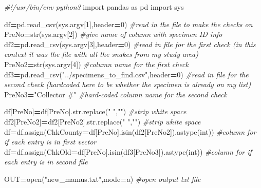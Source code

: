 \documentclass[
]{article}
\newenvironment{Shaded}{\begin{snugshade}}{\end{snugshade}}
\newcommand{\BuiltInTok}[1]{#1}
\newcommand{\CommentTok}[1]{\textcolor[rgb]{0.56,0.35,0.01}{\textit{#1}}}
\newcommand{\DecValTok}[1]{\textcolor[rgb]{0.00,0.00,0.81}{#1}}
\newcommand{\ImportTok}[1]{#1}
\newcommand{\NormalTok}[1]{#1}
\newcommand{\OperatorTok}[1]{\textcolor[rgb]{0.81,0.36,0.00}{\textbf{#1}}}
\newcommand{\StringTok}[1]{\textcolor[rgb]{0.31,0.60,0.02}{#1}}
\begin{document}
\begin{Shaded}
\begin{Highlighting}[]
\CommentTok{\#!/usr/bin/env python3}
\ImportTok{import}\NormalTok{ pandas }\ImportTok{as}\NormalTok{ pd}
\ImportTok{import}\NormalTok{ sys}

\NormalTok{df}\OperatorTok{=}\NormalTok{pd.read\_csv(sys.argv[}\DecValTok{1}\NormalTok{],header}\OperatorTok{=}\DecValTok{0}\NormalTok{) }\CommentTok{\#read in the file to make the checks on}
\NormalTok{PreNo}\OperatorTok{=}\BuiltInTok{str}\NormalTok{(sys.argv[}\DecValTok{2}\NormalTok{]) }\CommentTok{\#give name of column with specimen ID info}
\NormalTok{df2}\OperatorTok{=}\NormalTok{pd.read\_csv(sys.argv[}\DecValTok{3}\NormalTok{],header}\OperatorTok{=}\DecValTok{0}\NormalTok{) }\CommentTok{\#read in file for the first check (in this context it was the file with all the snakes from my study area)}
\NormalTok{PreNo2}\OperatorTok{=}\BuiltInTok{str}\NormalTok{(sys.argv[}\DecValTok{4}\NormalTok{]) }\CommentTok{\#column name for the first check}
\NormalTok{df3}\OperatorTok{=}\NormalTok{pd.read\_csv(}\StringTok{"../specimens\_to\_find.csv"}\NormalTok{,header}\OperatorTok{=}\DecValTok{0}\NormalTok{) }\CommentTok{\#read in file for the second check (hardcoded here to be whether the specimen is already on my list)}
\NormalTok{PreNo3}\OperatorTok{=}\StringTok{"Collector \#"} \CommentTok{\#hard{-}coded column name for the second check}

\NormalTok{df[PreNo]}\OperatorTok{=}\NormalTok{df[PreNo].}\BuiltInTok{str}\NormalTok{.replace(}\StringTok{" "}\NormalTok{,}\StringTok{""}\NormalTok{) }\CommentTok{\#strip white space}
\NormalTok{df2[PreNo2]}\OperatorTok{=}\NormalTok{df2[PreNo2].}\BuiltInTok{str}\NormalTok{.replace(}\StringTok{" "}\NormalTok{,}\StringTok{""}\NormalTok{) }\CommentTok{\#strip white space}
\NormalTok{df}\OperatorTok{=}\NormalTok{df.assign(ChkCounty}\OperatorTok{=}\NormalTok{df[PreNo].isin(df2[PreNo2]).astype(}\BuiltInTok{int}\NormalTok{)) }\CommentTok{\#column for if each entry is in first vector}
\NormalTok{df}\OperatorTok{=}\NormalTok{df.assign(ChkOld}\OperatorTok{=}\NormalTok{df[PreNo].isin(df3[PreNo3]).astype(}\BuiltInTok{int}\NormalTok{)) }\CommentTok{\#column for if each entry is in second file}

\NormalTok{OUT}\OperatorTok{=}\BuiltInTok{open}\NormalTok{(}\StringTok{"new\_mamus.txt"}\NormalTok{,mode}\OperatorTok{=}\StringTok{\textquotesingle{}a\textquotesingle{}}\NormalTok{) }\CommentTok{\#open output txt file}


\end{Highlighting}
\end{Shaded}
\end{document}
